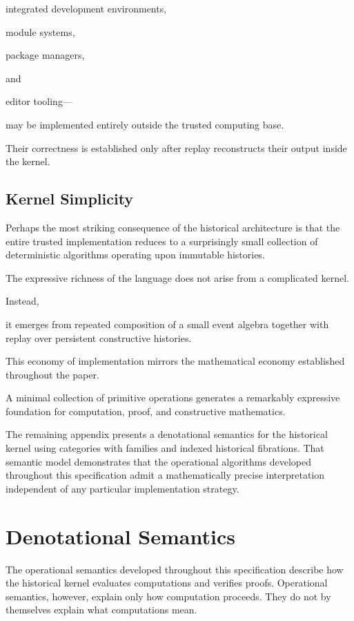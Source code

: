 \documentclass[12pt,oneside]{article}
\theoremstyle{definition}
\theoremstyle{remark}
\begin{document}
integrated development environments,

module systems,

package managers,

and

editor tooling—

may be implemented entirely outside the trusted computing base.

Their correctness is established only after replay reconstructs their output
inside the kernel.


\subsection{Kernel Simplicity}

Perhaps the most striking consequence of the historical architecture is that the
entire trusted implementation reduces to a surprisingly small collection of
deterministic algorithms operating upon immutable histories.

The expressive richness of the language does not arise from a complicated
kernel.

Instead,

it emerges from repeated composition of a small event algebra together with
replay over persistent constructive histories.

This economy of implementation mirrors the mathematical economy established
throughout the paper.

A minimal collection of primitive operations generates a remarkably expressive
foundation for computation, proof, and constructive mathematics.

The remaining appendix presents a denotational semantics for the historical
kernel using categories with families and indexed historical fibrations. That
semantic model demonstrates that the operational algorithms developed
throughout this specification admit a mathematically precise interpretation
independent of any particular implementation strategy.

\section{Denotational Semantics}

The operational semantics developed throughout this specification describe how
the historical kernel evaluates computations and verifies proofs. Operational
semantics, however, explain only how computation proceeds. They do not by
themselves explain what computations mean.
\end{document}
